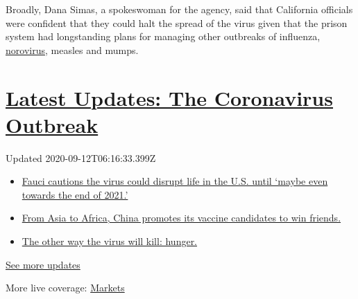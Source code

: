 Broadly, Dana Simas, a spokeswoman for the agency, said that California
officials were confident that they could halt the spread of the virus
given that the prison system had longstanding plans for managing other
outbreaks of influenza,
\href{https://www.cdc.gov/norovirus/trends-outbreaks/burden-US.html}{norovirus},
measles and mumps.

\hypertarget{latest-updates-the-coronavirus-outbreak}{%
\section{\texorpdfstring{\href{https://www.nytimes3xbfgragh.onion/2020/09/11/world/covid-19-coronavirus.html?action=click\&pgtype=Article\&state=default\&region=MAIN_CONTENT_1\&context=storylines_live_updates}{Latest
Updates: The Coronavirus
Outbreak}}{Latest Updates: The Coronavirus Outbreak}}\label{latest-updates-the-coronavirus-outbreak}}

Updated 2020-09-12T06:16:33.399Z

\begin{itemize}
\tightlist
\item
  \href{https://www.nytimes3xbfgragh.onion/2020/09/11/world/covid-19-coronavirus.html?action=click\&pgtype=Article\&state=default\&region=MAIN_CONTENT_1\&context=storylines_live_updates\#link-dfb8a16}{Fauci
  cautions the virus could disrupt life in the U.S. until `maybe even
  towards the end of 2021.'}
\item
  \href{https://www.nytimes3xbfgragh.onion/2020/09/11/world/covid-19-coronavirus.html?action=click\&pgtype=Article\&state=default\&region=MAIN_CONTENT_1\&context=storylines_live_updates\#link-7104d154}{From
  Asia to Africa, China promotes its vaccine candidates to win friends.}
\item
  \href{https://www.nytimes3xbfgragh.onion/2020/09/11/world/covid-19-coronavirus.html?action=click\&pgtype=Article\&state=default\&region=MAIN_CONTENT_1\&context=storylines_live_updates\#link-393ad215}{The
  other way the virus will kill: hunger.}
\end{itemize}

\href{https://www.nytimes3xbfgragh.onion/2020/09/11/world/covid-19-coronavirus.html?action=click\&pgtype=Article\&state=default\&region=MAIN_CONTENT_1\&context=storylines_live_updates}{See
more updates}

More live coverage:
\href{https://www.nytimes3xbfgragh.onion/live/2020/09/11/business/stock-market-today-coronavirus?action=click\&pgtype=Article\&state=default\&region=MAIN_CONTENT_1\&context=storylines_live_updates}{Markets}

